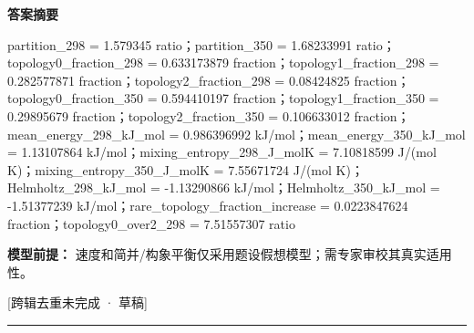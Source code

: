 \documentclass[UTF8,11pt,a4paper]{ctexart}
\begin{document}
\noindent\textbf{答案摘要}\par
partition\_298 = 1.579345 ratio；partition\_350 = 1.68233991 ratio；topology0\_fraction\_298 = 0.633173879 fraction；topology1\_fraction\_298 = 0.282577871 fraction；topology2\_fraction\_298 = 0.08424825 fraction；topology0\_fraction\_350 = 0.594410197 fraction；topology1\_fraction\_350 = 0.29895679 fraction；topology2\_fraction\_350 = 0.106633012 fraction；mean\_energy\_298\_kJ\_mol = 0.986396992 kJ/mol；mean\_energy\_350\_kJ\_mol = 1.13107864 kJ/mol；mixing\_entropy\_298\_J\_molK = 7.10818599 J/(mol K)；mixing\_entropy\_350\_J\_molK = 7.55671724 J/(mol K)；Helmholtz\_298\_kJ\_mol = -1.13290866 kJ/mol；Helmholtz\_350\_kJ\_mol = -1.51377239 kJ/mol；rare\_topology\_fraction\_increase = 0.0223847624 fraction；topology0\_over2\_298 = 7.51557307 ratio\par
\noindent\textbf{模型前提：}
速度和简并/构象平衡仅采用题设假想模型；需专家审校其真实适用性。\par
\noindent\textcolor{red!65!black}{[跨辑去重未完成 · 草稿]} \par
\medskip\hrule\medskip
{}
\end{document}
